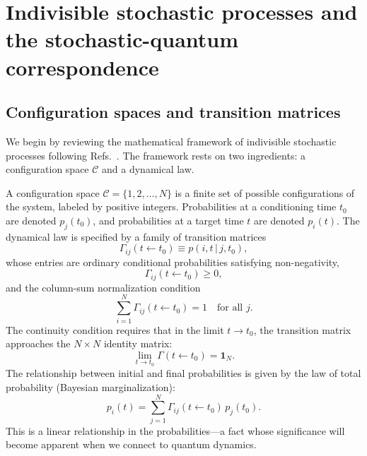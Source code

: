 \documentclass[aps,prd,twocolumn,superscriptaddress,nofootinbib]{revtex4-2}
\begin{document}
\section{Indivisible stochastic processes and the stochastic-quantum correspondence}
\label{sec:SQC}

\subsection{Configuration spaces and transition matrices}

We begin by reviewing the mathematical framework of indivisible stochastic processes following Refs.~\cite{Barandes2025SQC,Barandes2025SQT,Barandes2025QSIP}. The framework rests on two ingredients: a configuration space $\mathcal{C}$ and a dynamical law.

A configuration space $\mathcal{C} = \{1, 2, \ldots, N\}$ is a finite set of possible configurations of the system, labeled by positive integers. Probabilities at a conditioning time $t_0$ are denoted $p_j(t_0)$, and probabilities at a target time $t$ are denoted $p_i(t)$. The dynamical law is specified by a family of transition matrices
\begin{equation}
\Gamma_{ij}(t \leftarrow t_0) \equiv p(i,t \,|\, j,t_0),
\label{eq:transition}
\end{equation}
whose entries are ordinary conditional probabilities satisfying non-negativity,
\begin{equation}
\Gamma_{ij}(t \leftarrow t_0) \geq 0,
\label{eq:nonneg}
\end{equation}
and the column-sum normalization condition
\begin{equation}
\sum_{i=1}^{N} \Gamma_{ij}(t \leftarrow t_0) = 1 \quad \text{for all } j.
\label{eq:colsum}
\end{equation}
The continuity condition requires that in the limit $t \to t_0$, the transition matrix approaches the $N \times N$ identity matrix:
\begin{equation}
\lim_{t \to t_0} \Gamma(t \leftarrow t_0) = \mathbf{1}_N.
\label{eq:continuity}
\end{equation}
The relationship between initial and final probabilities is given by the law of total probability (Bayesian marginalization):
\begin{equation}
p_i(t) = \sum_{j=1}^{N} \Gamma_{ij}(t \leftarrow t_0)\, p_j(t_0).
\label{eq:marginalization}
\end{equation}
This is a linear relationship in the probabilities---a fact whose significance will become apparent when we connect to quantum dynamics.
\end{document}
